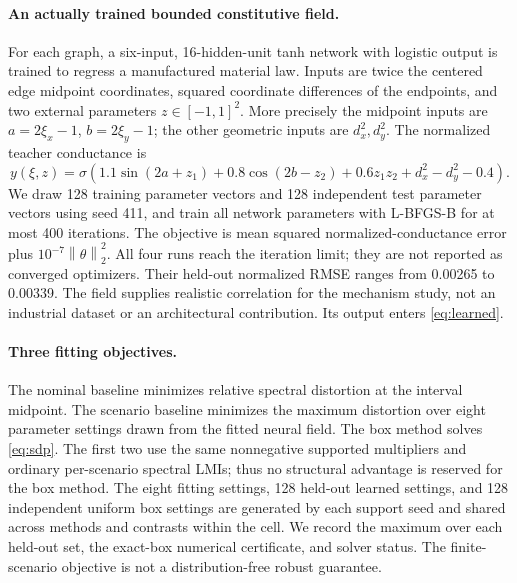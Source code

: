 \documentclass[11pt]{article}
\newcommand{\norm}[1]{\left\lVert#1\right\rVert}
\begin{document}
\paragraph{An actually trained bounded constitutive field.}
For each graph, a six-input, 16-hidden-unit tanh network with logistic output is trained to regress a manufactured material law. Inputs are twice the centered edge midpoint coordinates, squared coordinate differences of the endpoints, and two external parameters $z\in[-1,1]^2$. More precisely the midpoint inputs are $a=2\xi_x-1$, $b=2\xi_y-1$; the other geometric inputs are $d_x^2,d_y^2$. The normalized teacher conductance is
\begin{equation}
y(\xi,z)=\sigma\!\left(1.1\sin(2a+z_1)+0.8\cos(2b-z_2)+0.6z_1z_2+d_x^2-d_y^2-0.4\right).
\end{equation}
We draw 128 training parameter vectors and 128 independent test parameter vectors using seed 411, and train all network parameters with L-BFGS-B for at most 400 iterations. The objective is mean squared normalized-conductance error plus $10^{-7}\norm{\theta}_2^2$. All four runs reach the iteration limit; they are not reported as converged optimizers. Their held-out normalized RMSE ranges from 0.00265 to 0.00339. The field supplies realistic correlation for the mechanism study, not an industrial dataset or an architectural contribution. Its output enters \eqref{eq:learned}.

\paragraph{Three fitting objectives.}
The nominal baseline minimizes relative spectral distortion at the interval midpoint. The scenario baseline minimizes the maximum distortion over eight parameter settings drawn from the fitted neural field. The box method solves \eqref{eq:sdp}. The first two use the same nonnegative supported multipliers and ordinary per-scenario spectral LMIs; thus no structural advantage is reserved for the box method. The eight fitting settings, 128 held-out learned settings, and 128 independent uniform box settings are generated by each support seed and shared across methods and contrasts within the cell. We record the maximum over each held-out set, the exact-box numerical certificate, and solver status. The finite-scenario objective is not a distribution-free robust guarantee.
\end{document}
